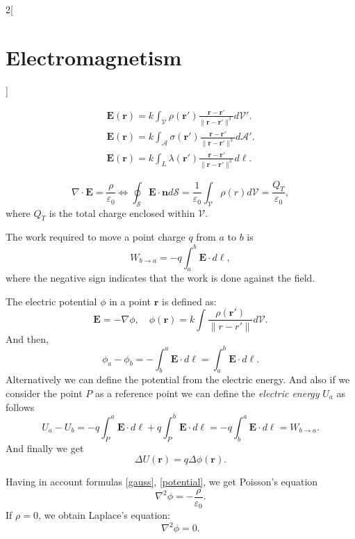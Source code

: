 \documentclass[class=article,10pt,crop=false]{standalone}
\begin{document}
\begin{multicols}{2}[\section{Electromagnetism}]
\begin{concept}
\begin{gather*}
    \boldsymbol{E}(\boldsymbol{r})=k\int_\mathcal{V}\rho(\boldsymbol{r}')\frac{\boldsymbol{r}-\boldsymbol{r}'}{\|\boldsymbol{r}-\boldsymbol{r}'\|^3}d\mathcal{V}'.\\
    \boldsymbol{E}(\boldsymbol{r})=k\int_\mathcal{A}\sigma(\boldsymbol{r}')\frac{\boldsymbol{r}-\boldsymbol{r}'}{\|\boldsymbol{r}-\boldsymbol{r}'\|^3}d\mathcal{A}'.\\
    \boldsymbol{E}(\boldsymbol{r})=k\int_L\lambda(\boldsymbol{r}')\frac{\boldsymbol{r}-\boldsymbol{r}'}{\|\boldsymbol{r}-\boldsymbol{r}'\|^3}d\ell.
\end{gather*}
\end{concept}
\begin{concept}
\begin{equation}
    \nabla\cdot\boldsymbol{E}=\frac{\rho}{\varepsilon_0}\iff\oint_\mathcal{S}\boldsymbol{E}\cdot\boldsymbol{n}d\mathcal{S}=\frac{1}{\varepsilon_0}\int_\mathcal{V}\rho(r)d\mathcal{V}=\frac{Q_T}{\varepsilon_0},
    \label{gauss}
\end{equation} where $Q_T$ is the total charge enclosed within $\mathcal{V}$.
\end{concept}
\begin{concept}[Work]
The work required to move a point charge $q$ from $a$ to $b$ is $$W_{b\to a}=-q\int_a^b\boldsymbol{E}\cdot d\ell,$$ where the negative sign indicates that the work is done against the field. 
\end{concept}
\begin{concept}
The electric potential $\phi$ in a point $\boldsymbol{r}$ is defined as: \begin{equation}
    \boldsymbol{E}=-\nabla\phi,\quad\phi(\boldsymbol{r})=k\int\frac{\rho(\boldsymbol{r}')}{\|r-r'\|}d\mathcal{V}.
    \label{potential}
\end{equation} And then, $$\phi_a-\phi_b=-\int_b^a\boldsymbol{E}\cdot d\ell=\int_a^b\boldsymbol{E}\cdot d\ell.$$ Alternatively we can define the potential from the electric energy.  And also if we consider the point $P$ as a reference point we can define the \textit{electric energy} $U_a$ as follows $$U_a-U_b=-q\int_P^a\boldsymbol{E}\cdot d\ell+q\int_P^b\boldsymbol{E}\cdot d\ell=-q\int_b^a\boldsymbol{E}\cdot d\ell=W_{b\to a}.$$ And finally we get $$\Delta U(\boldsymbol{r})=q\Delta\phi(\boldsymbol{r}).$$
\end{concept}
\begin{concept}
Having in account formulas \ref{gauss}, \ref{potential}, we get Poisson's equation $$\nabla^2\phi=-\frac{\rho}{\varepsilon_0}.$$ If $\rho=0$, we obtain Laplace's equation: $$\nabla^2\phi=0.$$

\end{concept}
\end{multicols}
\end{document}
